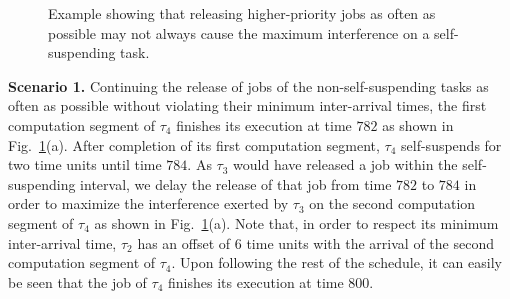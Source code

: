 \begin{figure}[t]
{{} }
\caption{Example showing that releasing higher-priority jobs as often as possible may not always cause the maximum interference on a self-suspending task.}
\label{fig:ex_crit_inst2}
\end{figure}

\noindent\textbf{Scenario 1.} Continuing the release of jobs of the non-self-suspending tasks as often as possible without violating their minimum inter-arrival times, the first computation segment of $\tau_4$ finishes its execution at time $782$ as shown in Fig.~\ref{fig:ex_crit_inst2}(a). After completion of its first computation segment, $\tau_4$ self-suspends for two time units until time $784$. As $\tau_3$ would have released a job within the self-suspending interval, we delay the release of that job from time $782$ to $784$ in order to maximize the interference exerted by $\tau_3$ on the second computation segment of $\tau_4$ as shown in Fig.~\ref{fig:ex_crit_inst2}(a). Note that, in order to respect its minimum inter-arrival time, $\tau_2$ has an offset of $6$ time units with the arrival of the second computation segment of $\tau_4$. Upon following the rest of the schedule, it can easily be seen that the job of $\tau_4$ finishes its execution at time $800$.

